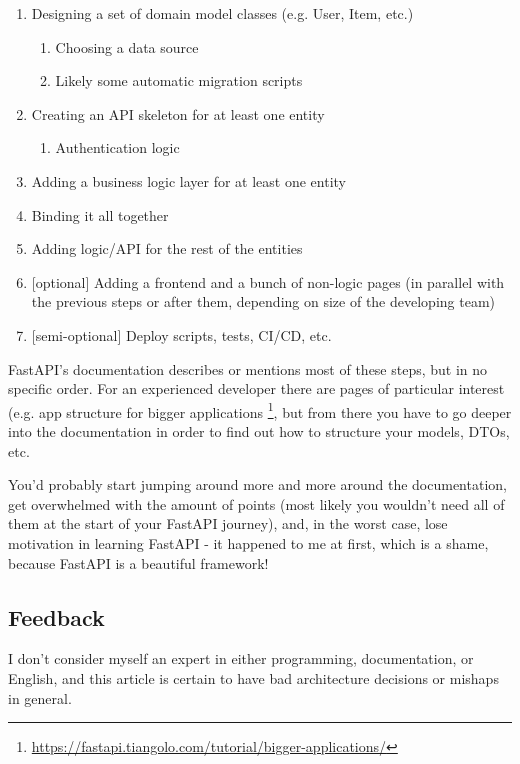\documentclass[14pt]{extarticle}
\newcommand{\flink}[1]{\footnote{\href{#1}{#1}}}
\begin{document}
\begin{enumerate}
    \item Designing a set of domain model classes (e.g. User, Item, etc.)
        \begin{enumerate}
            \item Choosing a data source
            \item Likely some automatic migration scripts
        \end{enumerate}
    \item Creating an API skeleton for at least one entity
        \begin{enumerate}
            \item Authentication logic
        \end{enumerate}
    \item Adding a business logic layer for at least one entity
    \item Binding it all together
    \item Adding logic/API for the rest of the entities
    \item {[optional]} Adding a frontend and a bunch of non-logic pages (in parallel with the previous steps or after them, depending on size of the developing team)
    \item {[semi-optional]} Deploy scripts, tests, CI/CD, etc.
\end{enumerate}

FastAPI's documentation describes or mentions most of these steps, but in no specific order. For an experienced developer there are pages of particular interest (e.g. app structure for bigger applications \flink{https://fastapi.tiangolo.com/tutorial/bigger-applications/}, but from there you have to go deeper into the documentation in order to find out how to structure your models, DTOs, etc.

You'd probably start jumping around more and more around the documentation, get overwhelmed with the amount of points (most likely you wouldn't need all of them at the start of your FastAPI journey), and, in the worst case, lose motivation in learning FastAPI - it happened to me at first, which is a shame, because FastAPI is a beautiful framework!

\subsection{Feedback}

I don't consider myself an expert in either programming, documentation, or English, and this article is certain to have bad architecture decisions or mishaps in general.
\end{document}
